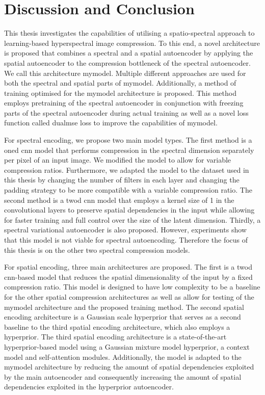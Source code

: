 \chapter{Discussion and Conclusion\label{cha:chapter6}}
This thesis investigates the capabilities of utilising a spatio-spectral approach to learning-based hyperspectral image compression. To this end, a novel architecture is proposed that combines a spectral and a spatial autoencoder by applying the spatial autoencoder to the compression bottleneck of the spectral autoencoder. We call this architecture \ac{mymodel}. Multiple different approaches are used for both the spectral and spatial parts of \ac{mymodel}. Additionally, a method of training optimised for the \ac{mymodel} architecture is proposed. This method employs pretraining of the spectral autoencoder in conjunction with freezing parts of the spectral autoencoder during actual training as well as a novel loss function called \ac{dualmse} loss to improve the capabilities of \ac{mymodel}.

For spectral encoding, we propose two main model types. The first method is a \ac{oned} \ac{cnn} model that performs compression in the spectral dimension separately per pixel of an input image. We modified the model to allow for variable compression ratios. Furthermore, we adapted the model to the dataset used in this thesis by changing the number of filters in each layer and changing the padding strategy to be more compatible with a variable compression ratio. The second method is a \ac{twod} \ac{cnn} model that employs a kernel size of 1 in the convolutional layers to preserve spatial dependencies in the input while allowing for faster training and full control over the size of the latent dimension. Thirdly, a spectral variational autoencoder is also proposed. However, experiments show that this model is not viable for spectral autoencoding. Therefore the focus of this thesis is on the other two spectral compression models.

For spatial encoding, three main architectures are proposed. The first is a \ac{twod} \ac{cnn}-based model that reduces the spatial dimensionality of the input by a fixed compression ratio. This model is designed to have low complexity to be a baseline for the other spatial compression architectures as well as allow for testing of the \ac{mymodel} architecture and the proposed training method. The second spatial encoding architecture is a Gaussian scale hyperprior that serves as a second baseline to the third spatial encoding architecture, which also employs a hyperprior.
The third spatial encoding architecture is a state-of-the-art hyperprior-based model using a Gaussian mixture model hyperprior, a context model and self-attention modules. Additionally, the model is adapted to the \ac{mymodel} architecture by reducing the amount of spatial dependencies exploited by the main autoencoder and consequently increasing the amount of spatial dependencies exploited in the hyperprior autoencoder.

